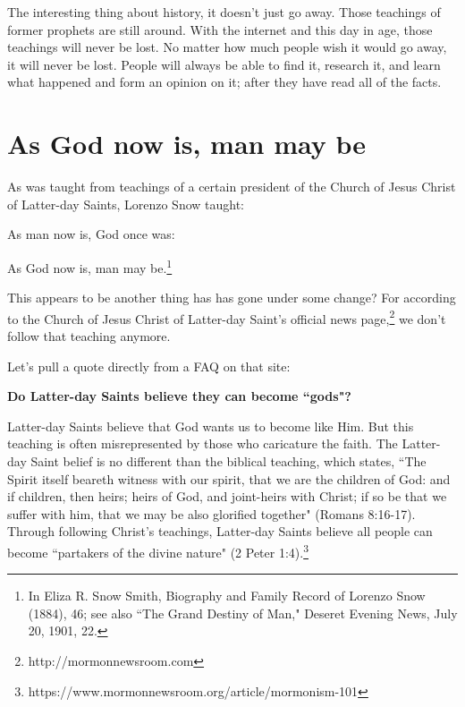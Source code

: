 \documentclass{article}
\begin{document}
The interesting thing about history, it doesn't just go away. Those teachings
of former prophets are still around. With the internet and this day in age,
those teachings will never be lost. No matter how much people wish it would go
away, it will never be lost. People will always be able to find it, research it,
and learn what happened and form an opinion on it; after they have read all of
the facts.

\newpage

\section{As God now is, man may be}

As was taught from teachings of a certain president of the Church of Jesus
Christ of Latter-day Saints, Lorenzo Snow taught:

\begin{displayquote}
As man now is, God once was:

As God now is, man may be.\footnote{In Eliza R. Snow Smith, Biography and 
Family Record of Lorenzo Snow (1884), 46; see also ``The Grand Destiny of Man," 
Deseret Evening News, July 20, 1901, 22.}
\end{displayquote}

This appears to be another thing has has gone under some change? For according
to the Church of Jesus Christ of Latter-day Saint's official news 
page,\footnote{http://mormonnewsroom.com} we don't follow that teaching anymore.

Let's pull a quote directly from a FAQ on that site:

\begin{displayquote}
\textbf{Do Latter-day Saints believe they can become ``gods"?}

Latter-day Saints believe that God wants us to become like Him. But this 
teaching is often misrepresented by those who caricature the faith. 
The Latter-day Saint belief is no different than the biblical teaching, 
which states, ``The Spirit itself beareth witness with our spirit, 
that we are the children of God: and if children, then heirs; heirs of God, 
and joint-heirs with Christ; if so be that we suffer with him, that we may be 
also glorified together" (Romans 8:16-17). Through following Christ's 
teachings, Latter-day Saints believe all people can become ``partakers of the 
divine nature"
(2 Peter 1:4).\footnote{https://www.mormonnewsroom.org/article/mormonism-101}
\end{displayquote}
\end{document}
